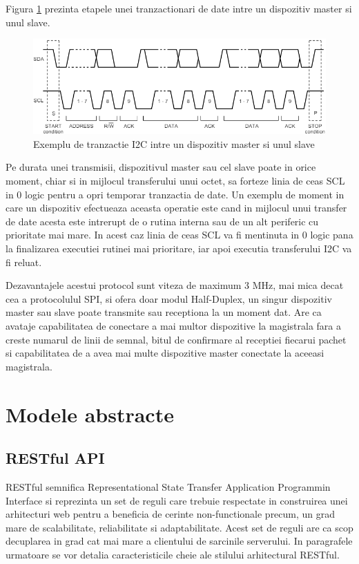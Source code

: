 Figura \ref{fig:I2CCompleteDataTransfer} prezinta etapele unei tranzactionari de date intre un dispozitiv master si unul slave.
\begin{figure}[H]
    \centering
    \includegraphics[scale=0.75]{figs/I2CCompleteDataTransfer.png}
    \caption{Exemplu de tranzactie I2C intre un dispozitiv master si unul slave \cite{i2ctutorial}}
    \label{fig:I2CCompleteDataTransfer}
\end{figure}

Pe durata unei transmisii, dispozitivul master sau cel slave poate in orice moment, chiar si in mijlocul transferului unui octet, sa forteze linia de ceas SCL in 
0 logic pentru a opri temporar tranzactia de date. Un exemplu de moment in care un dispozitiv efectueaza aceasta operatie este cand in mijlocul unui transfer 
de date acesta este intrerupt de o rutina interna sau de un alt periferic cu prioritate mai mare. In acest caz linia de ceas SCL va fi mentinuta in 0 logic pana 
la finalizarea executiei rutinei mai prioritare, iar apoi executia transferului I2C va fi reluat. 

Dezavantajele acestui protocol sunt viteza de maximum 3 MHz, mai mica decat cea a protocolulul SPI, si ofera doar modul Half-Duplex, un singur dispozitiv master 
sau slave poate transmite sau receptiona la un moment dat. Are ca avataje capabilitatea de conectare a mai multor dispozitive la magistrala fara a creste numarul 
de linii de semnal, bitul de confirmare al receptiei fiecarui pachet si capabilitatea de a avea mai multe dispozitive master conectate la aceeasi magistrala.

\section{Modele abstracte}\label{sec:modele}
\subsection{RESTful API}\label{sec:restapi}
RESTful semnifica Representational State Transfer Application Programmin Interface si reprezinta un set de reguli care trebuie respectate in construirea 
unei arhitecturi web pentru a beneficia de cerinte non-functionale precum, un grad mare de scalabilitate, reliabilitate si adaptabilitate. Acest set de 
reguli are ca scop decuplarea in grad cat mai mare a clientului de sarcinile serverului. In paragrafele urmatoare se vor detalia caracteristicile cheie 
ale stilului arhitectural RESTful.

